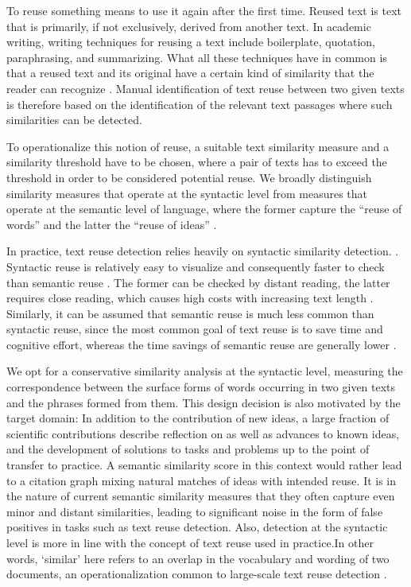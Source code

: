 \documentclass[fleqn,10pt]{wlscirep}
\begin{document}
To reuse something means to use it again after the first time. Reused text is text that is primarily, if not exclusively, derived from another text. In academic writing, writing techniques for reusing a text include boilerplate, quotation, paraphrasing, and summarizing. What all these techniques have in common is that a reused text and its original have a certain kind of similarity that the reader can recognize \cite{weber-wulff:2002}. Manual identification of text reuse between two given texts is therefore based on the identification of the relevant text passages where such similarities can be detected.

To operationalize this notion of reuse, a suitable text similarity measure and a similarity threshold have to be chosen, where a pair of texts has to exceed the threshold in order to be considered potential reuse. We broadly distinguish similarity measures that operate at the syntactic level from measures that operate at the semantic level of language, where the former capture the ``reuse of words'' and the latter the ``reuse of ideas'' \cite{sadeghi:2019}.

In practice, text reuse detection relies heavily on syntactic similarity detection. \cite{moskovitz:2021,vroniplag:2021}. Syntactic reuse is relatively easy to visualize and consequently faster to check than semantic reuse \cite{riehmann:2015}. The former can be checked by distant reading, the latter requires close reading, which causes high costs with increasing text length \cite{moretti:2013}. Similarly, it can be assumed that semantic reuse is much less common than syntactic reuse, since the most common goal of text reuse is to save time and cognitive effort, whereas the time savings of semantic reuse are generally lower \cite{potthast:2013c}.

We opt for a conservative similarity analysis at the syntactic level, measuring the correspondence between the surface forms of words occurring in two given texts and the phrases formed from them. This design decision is also motivated by the target domain: In addition to the contribution of new ideas, a large fraction of scientific contributions describe reflection on as well as advances to known ideas, and the development of solutions to tasks and problems up to the point of transfer to practice. A semantic similarity score in this context would rather lead to a citation graph mixing natural matches of ideas with intended reuse. It is in the nature of current semantic similarity measures that they often capture even minor and distant similarities, leading to significant noise in the form of false positives in tasks such as text reuse detection. Also, detection at the syntactic level is more in line with the concept of text reuse used in practice.In other words, `similar' here refers to an overlap in the vocabulary and wording of two documents, an operationalization common to large-scale text reuse detection \cite{martin:2015}.
\end{document}

